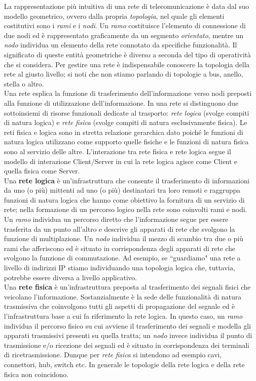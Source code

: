 La rappresentazione più intuitiva di una rete di telecomunicazione è data dal suo modello geometrico, ovvero dalla propria \textit{topologia}, nel quale gli elementi costitutivi sono i \textit{rami} e i \textit{nodi}. Un \textit{ramo} costituisce l'elemento di connessione di due nodi ed è rappresentato graficamente da un segmento \textit{orientato}, mentre un \textit{nodo} individua un elemento della rete connotato da specifiche funzionalità. Il significato di queste entità geometriche è diverso a seconda del tipo di operatività che si considera. Per gestire una rete è indispensabile conoscere la topologia della rete al giusto livello; si noti che non stiamo parlando di topologie a bus, anello, stella o altro.\\
Una rete esplica la funzione di trasferimento dell'informazione verso nodi preposti alla funzione di utilizzazione dell'informazione. In una rete si distinguono due sottoinsiemi di risorse funzionali dedicate al trasporto: \textit{rete logica} (svolge compiti di natura logica) e \textit{rete fisica} (svolge compiti di natura esclusivamente fisica). Le reti fisica e logica sono in stretta relazione gerarchica dato poiché le funzioni di natura logica utilizzano come supporto quelle fisiche e le funzioni di natura fisica sono al servizio delle altre. L'interazione tra rete fisica e rete logica segue il modello di interazione Client/Server in cui la rete logica agisce come Client e quella fisica come Server.\\
Una \textbf{rete logica} è un'infrastruttura che consente il trasferimento di informazioni da uno (o più) mittenti ad uno (o più) destinatari tra loro remoti e raggruppa funzioni di natura logica che hanno come obiettivo la fornitura di un servizio di rete; nella formazione di un percorso logico nella rete sono coinvolti rami e nodi. Un \textit{ramo} individua un percorso diretto che l'informazione segue per essere trasferita da un punto all'altro e descrive gli apparati di rete che svolgono la funzione di multiplazione. Un \textit{nodo} individua il mezzo di scambio tra due o più rami che afferiscono ed è situato in corrispondenza degli apparati di rete che svolgono la funzione di commutazione. Ad esempio, se \textquotedblleft guardiamo" una rete a livello di indirizzi IP stiamo individuando una topologia logica che, tuttavia, potrebbe essere diversa a livello applicativo.\\
Una \textbf{rete fisica} è un'infrastruttura preposta al trasferimento dei segnali fisici che veicolano l'informazione. Sostanzialmente è la sede delle funzionalità di natura trasmissiva che coinvolgono tutti gli aspetti di propagazione del segnale ed è l'infrastruttura base a cui fa riferimento la rete logica. In questo caso, un \textit{ramo} individua il percorso fisico su cui avviene il trasferimento dei segnali e modella gli apparati trasmissivi presenti su quella tratta; un \textit{nodo} invece individua il punto di trasmissione e/o ricezione dei segnali ed è situato in corrispondenza dei terminali di ricetrasmissione. Dunque per \textit{rete fisica} si intendono ad esempio cavi, connettori, hub, switch etc. In generale le topologie della rete logica e della rete fisica non coincidono.

